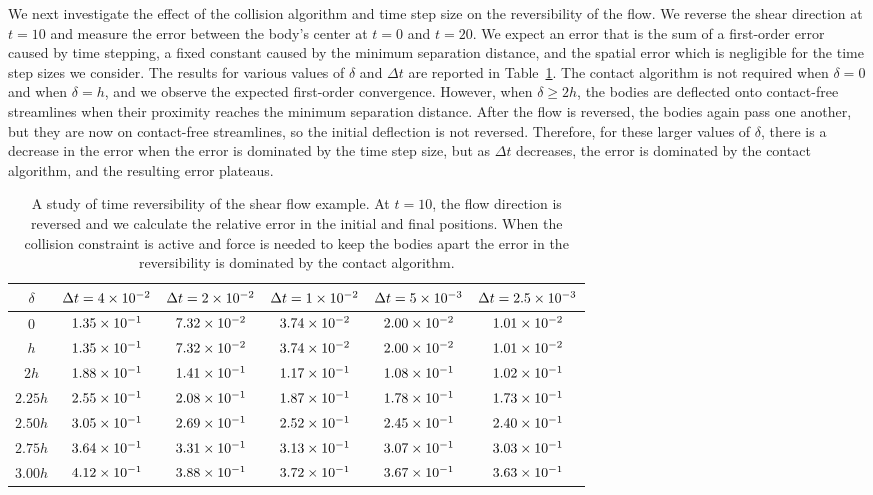 \documentclass[AMA,STIX1COL]{WileyNJD-v2}
\begin{document}
We next investigate the effect of the collision algorithm and time step
size on the reversibility of the flow. We reverse the shear direction at
$t=10$ and measure the error between the body's center at $t=0$ and
$t=20$.  We expect an error that is the sum of a first-order error
caused by time stepping, a fixed constant caused by the minimum
separation distance, and the spatial error which is negligible for the
time step sizes we consider.  The results for various values of $\delta$
and $\Delta t$ are reported in Table~\ref{tab:reverse}. The contact
algorithm is not required when $\delta=0$ and when $\delta=h$, and we
observe the expected first-order convergence.  However, when $\delta
\geq 2h$, the bodies are deflected onto contact-free streamlines when
their proximity reaches the minimum separation distance.  After the flow
is reversed, the bodies again pass one another, but they are now on
contact-free streamlines, so the initial deflection is not reversed.
Therefore, for these larger values of $\delta$, there is a decrease in
the error when the error is dominated by the time step size, but as
$\Delta t$ decreases, the error is dominated by the contact algorithm,
and the resulting error plateaus.

\begin{table}[t]
\caption{A study of time reversibility of the shear flow example. At
  $t=10$, the flow direction is reversed and we calculate the relative
  error in the initial and final positions. When the collision
  constraint is active and force is needed to keep the bodies apart the
  error in the reversibility is dominated by the contact
algorithm.\label{tab:reverse}}
  \centering
  \begin{tabular*}{500pt}{@{\extracolsep\fill}c| c c c c c@{\extracolsep\fill}}
    \toprule
    $\delta$ & $\Delta t = 4\times 10^{-2}$ &$\Delta t = 2\times 10^{-2}$ &$\Delta t =
    1\times 10^{-2}$ &$\Delta t = 5\times 10^{-3}$ &$\Delta t = 2.5\times 10^{-3}$\\
    \midrule
    0 & $1.35\times 10^{-1}$ & $7.32\times 10^{-2}$ & $3.74\times 10^{-2}$ & $2.00\times 10^{-2}$ & $1.01\times 10^{-2}$\\
    $h$ & $1.35\times 10^{-1}$ & $7.32\times 10^{-2}$ & $3.74\times 10^{-2}$ & $2.00\times 10^{-2}$ & $1.01\times 10^{-2}$\\
    $2h$ & $1.88\times 10^{-1}$ & $1.41\times 10^{-1}$ & $1.17\times 10^{-1}$ & $1.08\times 10^{-1}$ &
    $1.02\times 10^{-1}$\\
    $2.25h$ & $2.55\times 10^{-1}$ & $2.08\times 10^{-1}$ & $1.87\times 10^{-1}$ & $1.78\times 10^{-1}$ &
    $1.73\times 10^{-1}$\\
    $2.50h$ & $3.05\times 10^{-1}$ & $2.69\times 10^{-1}$ & $2.52\times 10^{-1}$ & $2.45\times 10^{-1}$ &
    $2.40\times 10^{-1}$\\
    $2.75h$ & $3.64\times 10^{-1}$ & $3.31\times 10^{-1}$ & $3.13\times 10^{-1}$ & $3.07\times 10^{-1}$ &
    $3.03\times 10^{-1}$\\
    $3.00h$ & $4.12\times 10^{-1}$ & $3.88\times 10^{-1}$ & $3.72\times 10^{-1}$ & $3.67\times 10^{-1}$ &
    $3.63\times 10^{-1}$ \\
    \bottomrule
  \end{tabular*}
\end{table}
\end{document}
